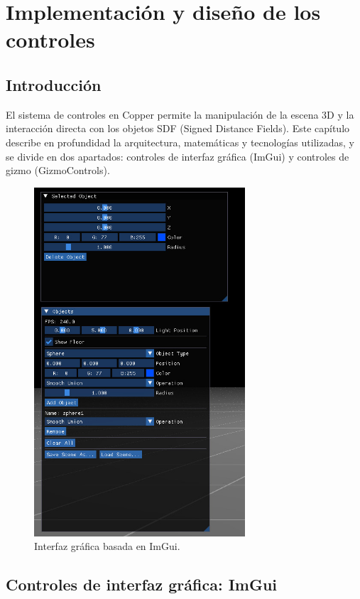 \chapter{Implementación y diseño de los controles}

\section{Introducción}

El sistema de controles en Copper permite la manipulación de la escena 3D y la
interacción directa con los objetos SDF (Signed Distance Fields). Este capítulo
describe en profundidad la arquitectura, matemáticas y tecnologías utilizadas,
y se divide en dos apartados: controles de interfaz gráfica (ImGui) y controles
de gizmo (GizmoControls).

\begin{figure}[H]
	\centering
	\includegraphics[width=0.7\textwidth]{imagenes/ImGui.jpg}
	\caption{Interfaz gráfica basada en ImGui.}
\end{figure}

\section{Controles de interfaz gráfica: ImGui}

